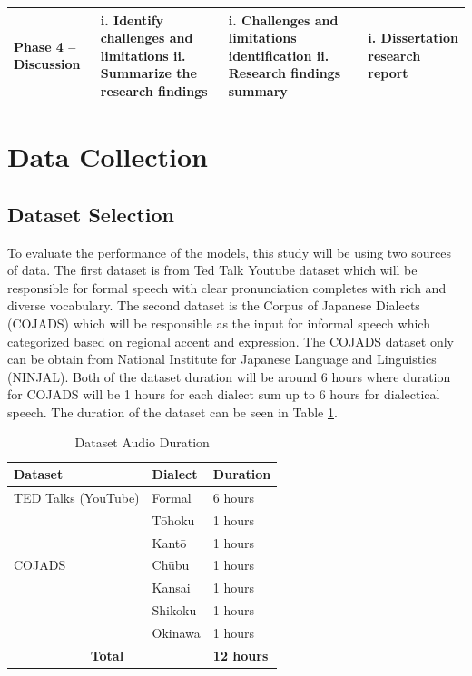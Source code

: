 \begin{table}[H]
\begin{tabular}{ p{2cm}|p{4cm}|p{4cm}|p{4cm} }
    \textbf{Phase 4 -- Discussion} 
        & i. Identify challenges and limitations
        \newline ii. Summarize the research findings
        & i. Challenges and limitations identification
        \newline ii. Research findings summary
        & i. Dissertation research report \\
    \hline
    
    \end{tabular}
\end{table}


\section{Data Collection}
\subsection{Dataset Selection}
To evaluate the performance of the models, this study will be using two sources of data. The first dataset is from Ted Talk Youtube dataset which will be responsible for formal speech with clear pronunciation completes with rich and diverse vocabulary. The second dataset is the Corpus of Japanese Dialects (COJADS) which will be responsible as the input for informal speech which categorized based on regional accent and expression. The COJADS dataset only can be obtain from National Institute for Japanese Language and Linguistics (NINJAL). Both of the dataset duration will be around 6 hours where duration for COJADS will be 1 hours for each dialect sum up to 6 hours for dialectical speech. The duration of the dataset can be seen in Table \ref{tab:dataset_length}.

\begin{table}[H]
    \centering
    \caption{Dataset Audio Duration}
    \label{tab:dataset_length}
    \begin{tabular}{p{3.5cm}|p{2.5cm}|p{2cm}}
    \hline
    \textbf{Dataset} & \textbf{Dialect} & \textbf{Duration} \\
    \hline
    TED Talks (YouTube) & Formal & 6 hours \\
    \hline
    \multirow{5}{*}{COJADS} 
        & Tōhoku & 1 hours \\
        & Kantō & 1 hours \\
        & Chūbu & 1 hours \\
        & Kansai & 1 hours \\
        & Shikoku & 1 hours \\
        & Okinawa & 1 hours \\
    \hline
    \multicolumn{2}{c|}{\textbf{Total}} & \textbf{12 hours} \\
    \hline
    \end{tabular}
\end{table}


